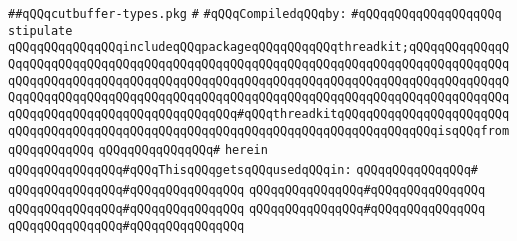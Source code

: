 \label{src/lib/x-kit/widget/edit/cutbuffer-types.pkg}
\verb|##qQQqcutbuffer-types.pkg|\newline
\verb|#|\newline
\newline
\verb|#qQQqCompiledqQQqby:|\newline
\verb|#qQQqqQQqqQQqqQQqqQQq|\newline
\newline
\newline
\newline
\verb|stipulate|\newline
\verb|qQQqqQQqqQQqqQQqincludeqQQqpackageqQQqqQQqqQQqthreadkit;qQQqqQQqqQQqqQQqqQQqqQQqqQQqqQQqqQQqqQQqqQQqqQQqqQQqqQQqqQQqqQQqqQQqqQQqqQQqqQQqqQQqqQQqqQQqqQQqqQQqqQQqqQQqqQQqqQQqqQQqqQQqqQQqqQQqqQQqqQQqqQQqqQQqqQQqqQQqqQQqqQQqqQQqqQQqqQQqqQQqqQQqqQQqqQQqqQQqqQQqqQQqqQQqqQQqqQQqqQQqqQQqqQQqqQQqqQQqqQQqqQQqqQQqqQQqqQQq#qQQqthreadkitqQQqqQQqqQQqqQQqqQQqqQQqqQQqqQQqqQQqqQQqqQQqqQQqqQQqqQQqqQQqqQQqqQQqqQQqqQQqqQQqqQQqisqQQqfromqQQqqQQqqQQq|\newline
\verb|qQQqqQQqqQQqqQQq#|\newline
\verb|herein|\newline
\newline
\verb|qQQqqQQqqQQqqQQq#qQQqThisqQQqgetsqQQqusedqQQqin:|\newline
\verb|qQQqqQQqqQQqqQQq#|\newline
\verb|qQQqqQQqqQQqqQQq#qQQqqQQqqQQqqQQq|\newline
\verb|qQQqqQQqqQQqqQQq#qQQqqQQqqQQqqQQq|\newline
\verb|qQQqqQQqqQQqqQQq#qQQqqQQqqQQqqQQq|\newline
\verb|qQQqqQQqqQQqqQQq#qQQqqQQqqQQqqQQq|\newline
\verb|qQQqqQQqqQQqqQQq#qQQqqQQqqQQqqQQq|\newline
